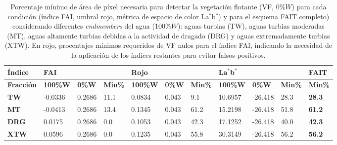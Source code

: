         \begin{table}
        \caption[Porcentaje mínimo de área de píxel ocupada por vegetación flotante necesario para garantizar la detección para diferentes \textit{endmembers} del agua.]{Porcentaje mínimo de área de píxel necesaria para detectar la vegetación flotante (VF, $0 \% W$) para cada condición (índice FAI, umbral rojo, métrica de espacio de color La$^{*}$b$^{*}$) y para el esquema FAIT completo) considerando diferentes \textit{endmembers} del agua ($100 \% W$): aguas turbias (TW), aguas turbias moderadas (MT), aguas altamente turbias debidas a la actividad de dragado (DRG) y aguas extremadamente turbias (XTW). En rojo, procentajes mínimos requeridos de VF nulos para el índice FAI, indicando la necesidad de la aplicación de los índices restantes para evitar falsos positivos.}
        \tiny
        \begin{tabular}{|l|l|l|l|l|l|l|l|l|l|l|}
        \hline
        \textbf{Índice} & \multicolumn{3}{l|}{\textbf{FAI}} & \multicolumn{3}{l|}{\textbf{Rojo}} & \multicolumn{3}{l|}{\textbf{La$^{*}$b$^{*}$}} & \textbf{FAIT}\\ \hline
        \textbf{Fracción} & \textbf{100\%W} & \textbf{0\%W} & \textbf{Min\%} & \textbf{100\%W} & \textbf{0\%W} & \textbf{Min\%} & \textbf{100\%W} & \textbf{0\%W} & \textbf{Min\%} & \textbf{Min\%} \\ \hline
        \textbf{TW}         & -0.0336 & 0.2686 & 11.1                       & 0.0834  & 0.043 & 9.1    & 10.6957 & -26.418       & 28.3   & \textbf{28.3}   \\ \hline
        \textbf{MT}         & -0.0413 & 0.2686 & 13.4                       & 0.1345  & 0.043 & 61.2   & 15.2198 & -26.418       & 51.8   & \textbf{61.2}   \\ \hline
        \textbf{DRG}        & 0.0175  & 0.2686 & {\color[HTML]{FE0000} 0.0} & 0.1053  & 0.043 & 42.3   & 17.1252 & -26.418       & 40.0   & \textbf{42.3}   \\ \hline
        \textbf{XTW}        & 0.0596  & 0.2686 & {\color[HTML]{FE0000} 0.0} & 0.1235  & 0.043 & 55.8   & 30.3149 & -26.418       & 56.2   & \textbf{56.2}   \\ \hline
        \end{tabular}
        \label{cam:tab:endmembers}
        \end{table}

